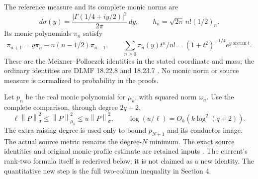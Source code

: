 \documentclass[11pt]{article}
\newcommand{\norm}[1]{\left\lVert#1\right\rVert}
\begin{document}
The reference measure and its complete monic norms are
\[
 d\sigma(y)=\frac{|\Gamma(1/4+iy/2)|^2}{2\pi}\,dy,\qquad
 h_n=\sqrt{2\pi}\,n!(1/2)_n.
 \tag{OCP2}
\]
Its monic polynomials $\pi_n$ satisfy
\[
 \pi_{n+1}=y\pi_n-n(n-1/2)\pi_{n-1},\qquad
 \sum_{n\ge0}\pi_n(y)t^n/n!=(1+t^2)^{-1/4}e^{y\arctan t}.
 \tag{OCP3}
\]
These are the Meixner--Pollaczek identities in the stated coordinate and mass; the ordinary identities are DLMF 18.22.8 and 18.23.7 \cite{dlmfpoly}. No monic norm or source measure is normalized to probability in the proofs.

Let $p_n$ be the real monic polynomial for $\mu_k$, with squared norm $\omega_n$. Use the complete comparison, through degree $2q+2$,
\[
 \ell\norm P_\sigma^2\le\norm P_{\mu_k}^2\le u\norm P_\sigma^2,
 \qquad \log(u/\ell)=O_h(k\log^2(q+2)).
 \tag{OCP4}
\]
The extra raising degree is used only to bound $p_{N+1}$ and its conductor image. The actual source metric remains the degree-$N$ minimum. The exact source identities and original monic-profile estimate are retained inputs \cite{heat,ivo}. The current's rank-two formula itself is rederived below; it is not claimed as a new identity. The quantitative new step is the full two-column inequality in Section 4.
\end{document}
